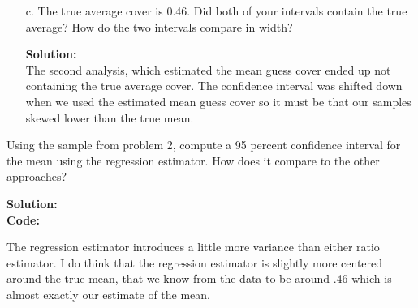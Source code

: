 \documentclass[12pt]{article}
\makeatletter
\theoremstyle{homework}
\newenvironment{exercise}[1]
{\def\@currentlabel{#1}\exercisecore}
{\endexercisecore}
\newcommand{\localhead}[1]{\par\smallskip\noindent\textbf{#1}\nobreak\\}%
\newcommand\solution{\localhead{Solution:}}
\makeatother
\begin{document}
\begin{exercise}{2.}
\begin{enumerate}
    \item[c.]The true average cover is 0.46. Did both of your intervals contain the true average? 
    How do the two intervals compare in width?\\
    \solution The second analysis, which estimated the mean guess cover ended up not containing the 
    true average cover. The confidence interval was shifted down when we used the estimated mean guess cover
    so it must be that our samples skewed lower than the true mean. 
  \end{enumerate}
\end{exercise}
\vspace{1in}


\begin{exercise}{3.} Using the sample from problem 2, compute a 95 percent confidence interval for the mean 
  using the regression estimator. How does it compare to the other approaches?\\
  \solution 
  \textbf{Code:}
  \begin{center}
 
  \end{center}
  The regression estimator introduces a little more variance than either ratio estimator. I do think that the regression 
  estimator is slightly more centered around the true mean, that we know from the data to be around .46 which is almost exactly
  our estimate of the mean. 
\end{exercise}
\vspace{1in}
\end{document}
